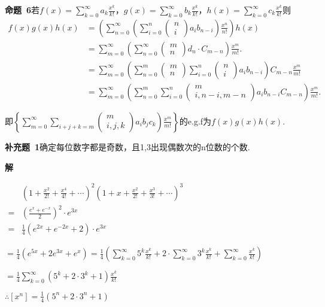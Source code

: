 \documentclass{report}
\begin{document}
\textbf{命题\ 6}若$f(x)=\sum_{k=0}^{\infty} a_{k} \frac{x^{k}}{k !}$，$g(x)=\sum_{k=0}^{\infty} b_{k} \frac{x^{k}}{k !}$，$h(x)=\sum_{k=0}^{\infty} c_{k} \frac{x^{k}}{k !}$则
$$
\begin{aligned}
f(x) g(x) h(x) &=\left(\sum_{n=0}^{\infty}\left(\sum_{i=0}^{n}\left(\begin{array}{l}
n \\ i
\end{array}\right) a_{i} b_{n-i}\right) \frac{x^{n}}{n !}\right) h(x) \\
&=\sum_{m=0}^{\infty}\left(\sum_{n=0}^{\infty}\left(\begin{array}{l}
m \\ n
\end{array}\right) d_{n} \cdot C_{m-n}\right) \frac{x^{m}}{m !}.\\
&=\sum_{m=0}^{\infty}\left(\sum_{n=0}^{m}\left(\begin{array}{l}
m \\ n
\end{array}\right) \sum_{i=0}^{n}\left(\begin{array}{l}
n \\ i
\end{array}\right) a_{i} b_{n-i}\right)C_{m-n} \frac{x^{m}}{m !} \\
&=\sum_{m=0}^{\infty}\left(\sum_{n=0}^{m} \sum_{i=0}^{n}\left(\begin{array}{c}
m \\i, n-i, m-n
\end{array}\right) a_{i} b_{n-i}C_{m-n} \right) \frac{x^{m}}{m !}.
\end{aligned}
$$

即$\left.\left\{\sum_{m=0}^{\infty} \sum_{i+j+k=m}\left(\begin{array}{c}m \\ i ,j, k\end{array}\right) a_{i} b_{j} c_{k}\right) \frac{x^{m}}{m !}\right\}$的e.g.f为$f(x)g(x)h(x)$.

\textbf{补充题\ 1}确定每位数字都是奇数，且1,3出现偶数次的n位数的个数.

\textbf{解  }

$\begin{aligned} &\left(1+\frac{x^{2}}{2 !}+\frac{x^{4}}{4 !}+\cdots\right)^{2}\left(1+x+\frac{x^{2}}{2 !}+\frac{x^{3}}{3 !}+\cdots\right)^{3} \\ =&\left(\frac{e^{x}+e^{-x}}{2}\right)^{2} \cdot e^{3 x} \\=& \frac{1}{4}\left(e^{2 x}+e^{-2 x}+2\right) \cdot e^{3 x} \end{aligned}$

$=\frac{1}{4}\left(e^{5 x}+2 e^{3 x}+e^{x}\right)=\frac{1}{4}\left(\sum_{k=0}^{\infty} 5^{k} \frac{ x^{k}}{k !}+2 \cdot \sum_{k=0}^{\infty} 3^{k} \frac{ x^{k}}{k !}+\sum_{k=0}^{\infty} \frac{x^{k}}{k !}\right)$


$=\frac{1}{4} \sum_{k=0}^{\infty}\left(5^{k}+2 \cdot 3^{k}+1\right) \frac{x^{k}}{k !}$

$\therefore\left[x^{n}\right]=\frac{1}{4}\left(5^{n}+2 \cdot 3^{n}+1\right)$
\end{document}
